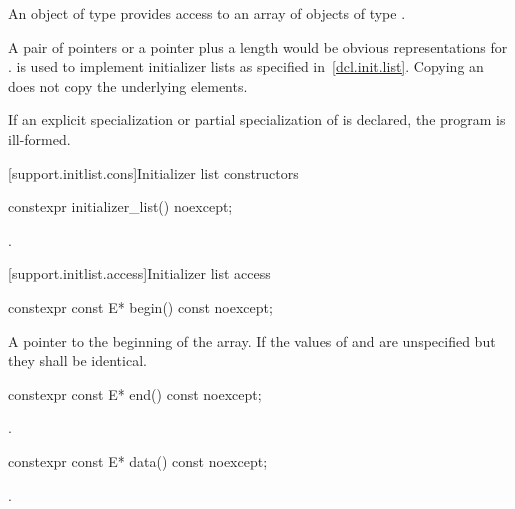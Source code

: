 \pnum
An object of type  provides access to an array of
objects of type .
\begin{note}
A pair of pointers or a pointer plus
a length would be obvious representations for .
 is used to implement initializer lists as specified
in~\ref{dcl.init.list}. Copying an  does not copy the underlying
elements.
\end{note}

\pnum
If an explicit specialization or partial specialization of
 is declared, the program is ill-formed.

[support.initlist.cons]{Initializer list constructors}

%
\begin{itemdecl}
constexpr initializer_list() noexcept;
\end{itemdecl}

\begin{itemdescr}
\pnum
\ensures
{}.
\end{itemdescr}

[support.initlist.access]{Initializer list access}

%
\begin{itemdecl}
constexpr const E* begin() const noexcept;
\end{itemdecl}

\begin{itemdescr}
\pnum
\returns
A pointer to the beginning of the array. If  the
values of  and  are unspecified but they shall be
identical.
\end{itemdescr}

%
\begin{itemdecl}
constexpr const E* end() const noexcept;
\end{itemdecl}

\begin{itemdescr}
\pnum
\returns
{}.
\end{itemdescr}

%
\begin{itemdecl}
constexpr const E* data() const noexcept;
\end{itemdecl}

\begin{itemdescr}
\pnum
\returns
{}.
\end{itemdescr}

